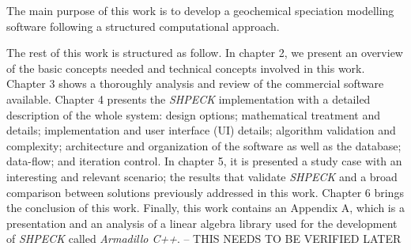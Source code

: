 \documentclass[ppgc,mestrado,English]{iiufrgs}
\begin{document}
The main purpose of this work is to develop a geochemical speciation modelling software following a structured computational approach. 


The rest of this work is structured as follow. In chapter 2, we present an overview of the basic concepts needed and technical concepts involved in this work. Chapter 3 shows a thoroughly analysis and review of the commercial software available. Chapter 4 presents the \emph{SHPECK} implementation with a detailed description of the whole system: design options; mathematical treatment and details; implementation and user interface (UI) details; algorithm validation and complexity; architecture and organization of the software as well as the database; data-flow; and iteration control. In chapter 5, it is presented a study case with an interesting and relevant scenario; the results that validate \emph{SHPECK} and a broad comparison between solutions previously addressed in this work. Chapter 6 brings the conclusion of this work. Finally, this work contains an Appendix A, which is a presentation and an analysis of a linear algebra library used for the development of \emph{SHPECK} called \emph{Armadillo C++}. -- THIS NEEDS TO BE VERIFIED LATER

\newpage
\end{document}
